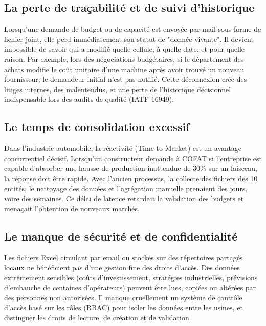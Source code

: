 \subsection{La perte de traçabilité et de suivi d'historique}
Lorsqu'une demande de budget ou de capacité est envoyée par mail sous forme de fichier joint, elle perd immédiatement son statut de "donnée vivante". Il devient impossible de savoir qui a modifié quelle cellule, à quelle date, et pour quelle raison. Par exemple, lors des négociations budgétaires, si le département des achats modifie le coût unitaire d'une machine après avoir trouvé un nouveau fournisseur, le demandeur initial n'est pas notifié. Cette déconnexion crée des litiges internes, des malentendus, et une perte de l'historique décisionnel indispensable lors des audits de qualité (IATF 16949).

\subsection{Le temps de consolidation excessif}
Dans l'industrie automobile, la réactivité (Time-to-Market) est un avantage concurrentiel décisif. Lorsqu'un constructeur demande à COFAT si l'entreprise est capable d'absorber une hausse de production inattendue de 30\% sur un faisceau, la réponse doit être rapide. Avec l'ancien processus, la collecte des fichiers des 10 entités, le nettoyage des données et l'agrégation manuelle prenaient des jours, voire des semaines. Ce délai de latence retardait la validation des budgets et menaçait l'obtention de nouveaux marchés.

\subsection{Le manque de sécurité et de confidentialité}
Les fichiers Excel circulant par email ou stockés sur des répertoires partagés locaux ne bénéficient pas d'une gestion fine des droits d'accès. Des données extrêmement sensibles (coûts d'investissement, stratégies industrielles, prévisions d'embauche de centaines d'opérateurs) peuvent être lues, copiées ou altérées par des personnes non autorisées. Il manque cruellement un système de contrôle d'accès basé sur les rôles (RBAC) pour isoler les données entre les usines, et distinguer les droits de lecture, de création et de validation.

